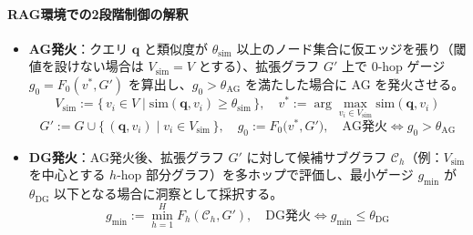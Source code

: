 \documentclass[ja=standard,xelatex]{bxjsarticle}
\begin{document}
\paragraph{RAG環境での2段階制御の解釈}
\begin{itemize}
  \item \textbf{AG発火}：クエリ $\mathbf{q}$ と類似度が $\theta_{\mathrm{sim}}$ 以上のノード集合に仮エッジを張り（閾値を設けない場合は $V_{\mathrm{sim}}{=}V$ とする）、拡張グラフ $G'$ 上で 0-hop ゲージ $g_0=F_0(v^*, G')$ を算出し、$g_0 > \theta_{\mathrm{AG}}$ を満たした場合に AG を発火させる。
  \begin{equation}
    V_{\mathrm{sim}} := \{\, v_i \in V \mid \mathrm{sim}(\mathbf{q}, v_i) \ge \theta_{\mathrm{sim}} \,\},\quad
    v^* := \arg\max_{v_i \in V_{\mathrm{sim}}} \mathrm{sim}(\mathbf{q}, v_i)
  \end{equation}
  \begin{equation}
    G' := G \cup \{\, (\mathbf{q}, v_i) \mid v_i \in V_{\mathrm{sim}} \,\},\quad
    g_0 := F_0\big(v^*, G'\big),\quad
    \text{AG発火} \iff g_0 > \theta_{\mathrm{AG}}
  \end{equation}

  \item \textbf{DG発火}：AG発火後、拡張グラフ $G'$ に対して候補サブグラフ $\mathcal{C}_h$（例：$V_{\mathrm{sim}}$ を中心とする $h$-hop 部分グラフ）を多ホップで評価し、最小ゲージ $g_{\min}$ が $\theta_{\mathrm{DG}}$ 以下となる場合に洞察として採択する。
  \begin{equation}
    g_{\min} := \min_{h=1}^{H} F_h(\mathcal{C}_h, G'),\quad
    \text{DG発火} \iff g_{\min} \le \theta_{\mathrm{DG}}
  \end{equation}
\end{itemize}
\end{document}
